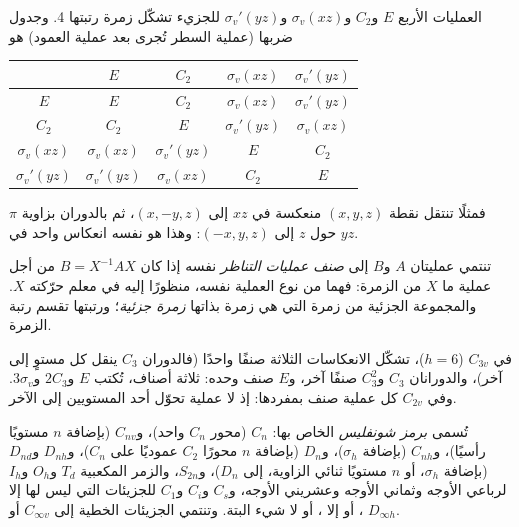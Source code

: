 \begin{example}\label{ex:b3:point-groups:c2v}
العمليات الأربع $E$ و$C_2$ و$\sigma_v(xz)$ و$\sigma_v'(yz)$ للجزيء  تشكّل
زمرة رتبتها 4. وجدول ضربها (عملية السطر تُجرى بعد عملية
العمود) هو
\begin{center}\small
\begin{tabular}{c|cccc}
\hline
 & $E$ & $C_2$ & $\sigma_v(xz)$ & $\sigma_v'(yz)$\\ \hline
$E$ & $E$ & $C_2$ & $\sigma_v(xz)$ & $\sigma_v'(yz)$\\
$C_2$ & $C_2$ & $E$ & $\sigma_v'(yz)$ & $\sigma_v(xz)$\\
$\sigma_v(xz)$ & $\sigma_v(xz)$ & $\sigma_v'(yz)$ & $E$ & $C_2$\\
$\sigma_v'(yz)$ & $\sigma_v'(yz)$ & $\sigma_v(xz)$ & $C_2$ & $E$\\ \hline
\end{tabular}
\end{center}
فمثلًا تنتقل نقطة $(x, y, z)$ منعكسة في $xz$ إلى $(x, -y, z)$، ثم
بالدوران بزاوية $\pi$ حول $z$ إلى $(-x, y, z)$: وهذا هو نفسه انعكاس واحد في
$yz$.
\end{example}

\begin{definition}\label{def:b3:point-groups:class}
تنتمي عمليتان $A$ و$B$ إلى \emph{صنف عمليات
التناظر} نفسه إذا كان $B = X^{-1}AX$ من أجل
عملية ما $X$ من الزمرة: فهما من نوع العملية نفسه، منظورًا إليه في
معلم حرّكته $X$. والمجموعة الجزئية من زمرة التي هي زمرة بذاتها
\emph{زمرة جزئية}؛ ورتبتها تقسم رتبة الزمرة.
\end{definition}

\begin{example}[أصناف \ce{NH3}]\label{ex:b3:point-groups:classes}
في $C_{3v}$ ($h = 6$)، تشكّل الانعكاسات الثلاثة صنفًا واحدًا (فالدوران $C_3$
ينقل كل مستوٍ إلى آخر)، والدورانان $C_3$ و$C_3^2$ صنفًا آخر،
و$E$ صنف وحده: ثلاثة أصناف، تُكتب $E$ و$2C_3$ و$3\sigma_v$. وفي
$C_{2v}$ كل عملية صنف بمفردها: إذ لا عملية تحوّل أحد المستويين إلى
الآخر.
\end{example}

\begin{definition}\label{def:b3:point-groups:schoenflies}
تُسمى  \emph{برمز شونفليس} الخاص بها:
$C_n$ (محور $C_n$ واحد)، و$C_{nv}$ (بإضافة $n$ مستويًا رأسيًا)، و$C_{nh}$
(بإضافة $\sigma_h$)، و$D_n$ (بإضافة $n$ محورًا $C_2$ عموديًا على $C_n$)، و$D_{nh}$
و$D_{nd}$ (بإضافة $\sigma_h$، أو $n$ مستويًا ثنائي الزاوية، إلى $D_n$)، و$S_{2n}$، 
والزمر المكعبية $T_d$ و$O_h$ و$I_h$ لرباعي الأوجه وثماني الأوجه
وعشريني الأوجه، و$C_s$ و$C_i$ و$C_1$ للجزيئات التي ليس لها إلا ،
أو إلا ، أو لا شيء البتة. وتنتمي الجزيئات الخطية إلى
$C_{\infty v}$ أو $D_{\infty h}$.
\end{definition}

